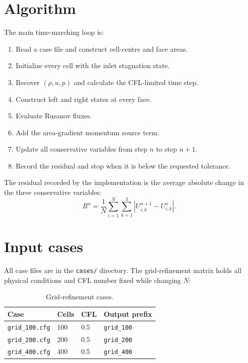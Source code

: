 \documentclass[11pt,a4paper]{article}
\begin{document}
\section{Algorithm}
The main time-marching loop is:
\begin{enumerate}
  \item Read a case file and construct cell-centre and face areas.
  \item Initialize every cell with the inlet stagnation state.
  \item Recover $(\rho,u,p)$ and calculate the CFL-limited time step.
  \item Construct left and right states at every face.
  \item Evaluate Rusanov fluxes.
  \item Add the area-gradient momentum source term.
  \item Update all conservative variables from step $n$ to step $n+1$.
  \item Record the residual and stop when it is below the requested tolerance.
\end{enumerate}

The residual recorded by the implementation is the average absolute change in
the three conservative variables:
\begin{equation}
  R^n=\frac{1}{N}\sum_{i=1}^{N}\sum_{k=1}^{3}
  \left|U_{i,k}^{n+1}-U_{i,k}^{n}\right|.
\end{equation}

\section{Input cases}
All case files are in the \texttt{cases/} directory. The grid-refinement matrix
holds all physical conditions and CFL number fixed while changing $N$:
\begin{table}[h]
\centering
\caption{Grid-refinement cases.}
\begin{tabular}{llll}
\toprule
Case & Cells & CFL & Output prefix \\
\midrule
\texttt{grid\_100.cfg} & 100 & 0.5 & \texttt{grid\_100} \\
\texttt{grid\_200.cfg} & 200 & 0.5 & \texttt{grid\_200} \\
\texttt{grid\_400.cfg} & 400 & 0.5 & \texttt{grid\_400} \\
\bottomrule
\end{tabular}
\end{table}
\end{document}
